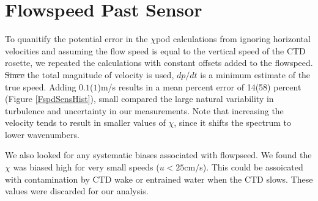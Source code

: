 \documentclass{ametsoc}
\providecommand{\DIFadd}[1]{{\protect\color{blue}\uwave{#1}}} %
\providecommand{\DIFdel}[1]{{\protect\color{red}\sout{#1}}}                      %
\providecommand{\DIFaddbegin}{} %
\providecommand{\DIFaddend}{} %
\providecommand{\DIFdelbegin}{} %
\providecommand{\DIFdelend}{} %
\begin{document}
%


\appendix[A]


\section{Flowspeed Past Sensor}

To quanitify the potential error in the $\chi$pod calculations from ignoring horizontal velocities and assuming the flow speed is equal to the vertical speed of the CTD rosette, we repeated the calculations with constant offsets added to the flowspeed. \DIFdelbegin \DIFdel{Since }\DIFdelend \DIFaddbegin \DIFadd{Note that since }\DIFaddend the total magnitude of velocity is used, $dp/dt$ is a minimum estimate of the true speed. Adding $0.1$($1$)m/s results in a mean percent error of 14(58) percent (Figure \ref{FspdSensHist}), small compared the large natural variability in turbulence and uncertainty in our measurements. Note that increasing the velocity tends to result in smaller values of $\chi$, since it shifts the spectrum to lower wavenumbers. 

We also looked for any systematic biases associated with flowpseed. We found the $\chi$ was biased high for very small speeds ($u<25$cm/s). This could be assoicated with contamination by CTD wake or entrained water when the CTD slows.  These values were discarded for our analysis.

\end{document}
